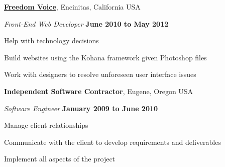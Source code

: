 \documentclass[11pt]{article}
\newenvironment{outerlist}[1][\enskip\textbullet]%
        {\begin{itemize}[#1]}{\end{itemize}%
         \vspace{-.6\baselineskip}}
\newenvironment{innerlist}[1][\enskip\textbullet]%
        {\begin{compactitem}[#1]}{\end{compactitem}}
\newcommand{\blankline}{\quad\pagebreak[2]}
\begin{document}
\blankline

\href{http://www.freedomvoice.com/}{\textbf{Freedom Voice}},
Encinitas, California USA
\begin{outerlist}

    \item[] \textit{Front-End Web Developer}%
            \hfill \textbf{June 2010 to May 2012}
    \begin{innerlist}
         \item Help with technology decisions
         \item Build websites using the Kohana framework given Photoshop files
         \item Work with designers to resolve unforeseen user interface issues
    \end{innerlist}
\end{outerlist}

\blankline

\textbf{Independent Software Contractor},
Eugene, Oregon USA
\begin{outerlist}

    \item[] \textit{Software Engineer}%
            \hfill \textbf{January 2009 to June 2010}
    \begin{innerlist}
        \item Manage client relationships
        \item Communicate with the client to develop requirements and deliverables
        \item Implement all aspects of the project
    \end{innerlist}

\end{outerlist}

\blankline
\end{document}
